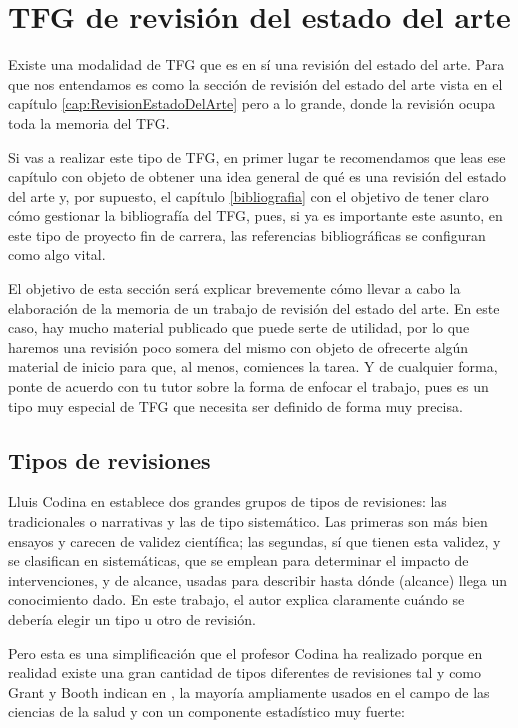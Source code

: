 \section{TFG de revisión del estado del arte}
\label{appendix:revisionestado}

Existe una modalidad de TFG que es en sí una revisión del estado del arte. Para que nos entendamos es como la sección de revisión del estado del arte vista en el capítulo \ref{cap:RevisionEstadoDelArte} pero a lo grande, donde la revisión ocupa toda la memoria del TFG.

Si vas a realizar este tipo de TFG, en primer lugar te recomendamos que leas ese capítulo con objeto de obtener una idea general de qué es una revisión del estado del arte y, por supuesto, el capítulo \ref{bibliografia} con el objetivo de tener claro cómo gestionar la bibliografía del TFG, pues, si ya es importante este asunto, en este tipo de proyecto fin de carrera, las referencias bibliográficas se configuran como algo vital.

El objetivo de esta sección será explicar brevemente cómo llevar a cabo la elaboración de la memoria de un trabajo de revisión del estado del arte. En este caso, hay mucho material publicado que puede serte de utilidad, por lo que haremos una revisión poco somera del mismo con objeto de ofrecerte algún material de inicio para que, al menos, comiences la tarea. Y de cualquier forma, ponte de acuerdo con tu tutor sobre la forma de enfocar el trabajo, pues es un tipo muy especial de TFG que necesita ser definido de forma muy precisa.

\subsection{Tipos de revisiones}

Lluis Codina en \cite{codina2024lluis} establece dos grandes grupos de tipos de revisiones: las tradicionales o narrativas y las de tipo sistemático. Las primeras son más bien ensayos y carecen de validez científica; las segundas, sí que tienen esta validez, y se clasifican en sistemáticas, que se emplean para determinar el impacto de intervenciones, y de alcance, usadas para describir hasta dónde (alcance) llega un conocimiento dado. En este trabajo, el autor explica claramente cuándo se debería elegir un tipo u otro de revisión.

Pero esta es una simplificación que el profesor Codina ha realizado porque en realidad existe una gran cantidad de tipos diferentes de revisiones tal y como Grant y Booth indican en \cite{grant2009maria}, la mayoría ampliamente usados en el campo de las ciencias de la salud y con un componente estadístico muy fuerte:

